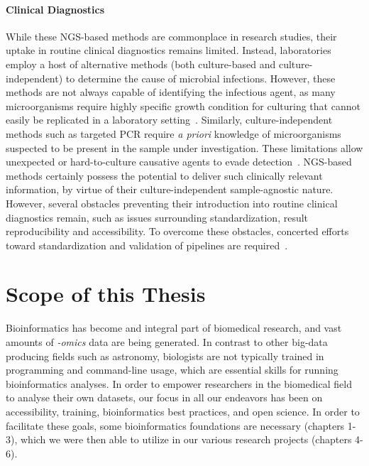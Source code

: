\begin{justify}
\paragraph{Clinical Diagnostics}
While these NGS-based methods are commonplace in research studies, their uptake in routine clinical diagnostics remains limited. Instead, laboratories employ a host of alternative methods (both culture-based and culture-independent) to determine the cause of microbial infections. However, these methods are not always capable of identifying the infectious agent, as many microorganisms require highly specific growth condition for culturing that cannot easily be replicated in a laboratory setting~\cite{lagier2015rebirth}. Similarly, culture-independent methods such as targeted PCR require \emph{a priori} knowledge of microorganisms suspected to be present in the sample under investigation. These limitations allow unexpected or hard-to-culture causative agents to evade detection~\cite{yang2004pcr}. NGS-based methods certainly possess the potential to deliver such clinically relevant information, by virtue of their culture-independent sample-agnostic nature. However, several obstacles preventing their introduction into routine clinical diagnostics remain, such as issues surrounding standardization, result reproducibility and accessibility. To overcome these obstacles, concerted efforts toward standardization and validation of pipelines are required~\cite{caliendo2013better}.

\section{Scope of this Thesis}

Bioinformatics has become and integral part of biomedical research, and vast amounts of \emph{-omics} data are being generated. In contrast to other big-data producing fields such as astronomy, biologists are not typically trained in programming and command-line usage, which are essential skills for running bioinformatics analyses. In order to empower researchers in the biomedical field to analyse their own datasets, our focus in all our endeavors has been on accessibility, training, bioinformatics best practices, and open science. In order to facilitate these goals, some bioinformatics foundations are necessary (chapters 1-3), which we were then able to utilize in our various research projects (chapters 4-6).


\end{justify}
